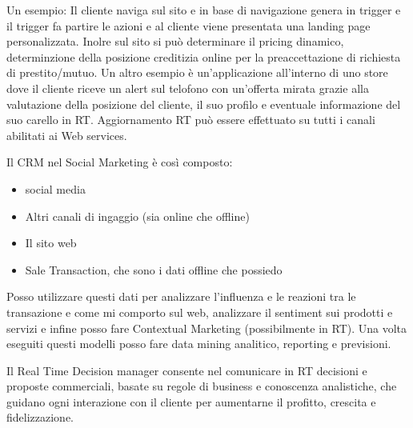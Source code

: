 \documentclass[11pt]{article}
\newenvironment{nosepitemize}{\begin{itemize}[noitemsep,topsep=0ex]}{\end{itemize}}
\begin{document}
Un esempio: Il cliente naviga sul sito e in base di navigazione genera in trigger e il trigger fa partire le azioni e al cliente viene presentata una landing page personalizzata.
Inolre sul sito si può determinare il pricing dinamico, determinzione della posizione creditizia online per la preaccettazione di richiesta di prestito/mutuo. \newline
Un altro esempio è un'applicazione all'interno di uno store dove il cliente riceve un alert sul telofono con un'offerta mirata grazie alla valutazione della posizione del cliente, il suo profilo e eventuale informazione del suo carello in RT. Aggiornamento RT può essere effettuato su tutti i canali abilitati ai Web services.

Il CRM nel Social Marketing è così composto:
\begin{nosepitemize}
	\item social media
	\item Altri canali di ingaggio (sia online che offline)
	\item Il sito web
	\item Sale Transaction, che sono i dati offline che possiedo
\end{nosepitemize}
Posso utilizzare questi dati per analizzare l'influenza e le reazioni tra le transazione e come mi comporto sul web, analizzare il sentiment sui prodotti e servizi e infine posso fare Contextual Marketing (possibilmente in RT). Una volta eseguiti questi modelli posso fare data mining analitico, reporting e previsioni. 

Il Real Time Decision manager consente nel comunicare in RT decisioni e proposte commerciali, basate su regole di business e conoscenza analistiche, che guidano ogni interazione con il cliente per aumentarne il profitto, crescita e fidelizzazione.
\end{document}
